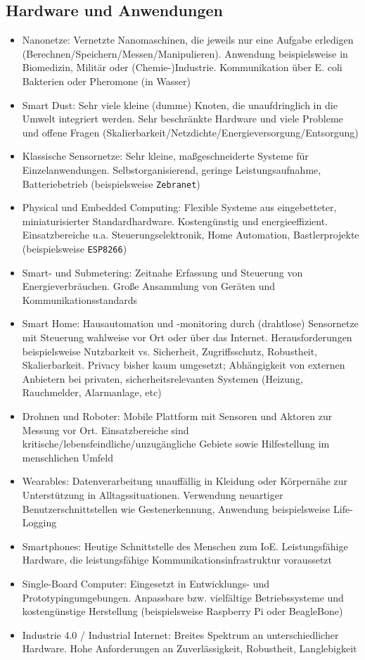 \subsection{Hardware und Anwendungen}
\begin{itemize}
	\item Nanonetze: Vernetzte Nanomaschinen, die jeweils nur eine Aufgabe erledigen (Berechnen/Speichern/Messen/Manipulieren). Anwendung beispielsweise in Biomedizin, Militär oder (Chemie-)Industrie. Kommunikation über E. coli Bakterien oder Pheromone (in Wasser)
	\item Smart Dust: Sehr viele kleine (dumme) Knoten, die unaufdringlich in die Umwelt integriert werden. Sehr beschränkte Hardware und viele Probleme und offene Fragen (Skalierbarkeit/Netzdichte/Energieversorgung/Entsorgung)
	\item Klassische Sensornetze: Sehr kleine, maßgeschneiderte Systeme für Einzelanwendungen. Selbstorganisierend, geringe Leistungsaufnahme, Batteriebetrieb (beispielsweise \texttt{Zebranet})
	\item Physical und Embedded Computing: Flexible Systeme aus eingebetteter, miniaturisierter Standardhardware. Kostengünstig und energieeffizient. Einsatzbereiche u.a. Steuerungselektronik, Home Automation, Bastlerprojekte (beispielsweise \texttt{ESP8266})
	\item Smart- und Submetering: Zeitnahe Erfassung und Steuerung von Energieverbräuchen. Große Ansammlung von Geräten und Kommunikationsstandards
	\item Smart Home: Hausautomation und -monitoring durch (drahtlose) Sensornetze mit Steuerung wahlweise vor Ort oder über das Internet. Herausforderungen beispielsweise Nutzbarkeit vs. Sicherheit, Zugriffsschutz, Robustheit, Skalierbarkeit. Privacy bisher kaum umgesetzt; Abhängigkeit von externen Anbietern bei privaten, sicherheitsrelevanten Systemen (Heizung, Rauchmelder, Alarmanlage, etc)
	\item Drohnen und Roboter: Mobile Plattform mit Sensoren und Aktoren zur Messung vor Ort. Einsatzbereiche sind kritische/lebensfeindliche/unzugängliche Gebiete sowie Hilfestellung im menschlichen Umfeld
	\item Wearables: Datenverarbeitung unauffällig in Kleidung oder Körpernähe zur Unterstützung in Alltagssituationen. Verwendung neuartiger Benutzerschnittstellen wie Gestenerkennung, Anwendung beispielsweise Life-Logging
	\item Smartphones: Heutige Schnittstelle des Menschen zum IoE. Leistungsfähige Hardware, die leistungsfähige Kommunikationsinfrastruktur voraussetzt
	\item Single-Board Computer: Eingesetzt in Entwicklungs- und Prototypingumgebungen. Anpassbare bzw. vielfältige Betriebssysteme und kostengünstige Herstellung (beispielsweise Raspberry Pi oder BeagleBone)
	\item Industrie 4.0 / Industrial Internet: Breites Spektrum an unterschiedlicher Hardware. Hohe Anforderungen an Zuverlässigkeit, Robustheit, Langlebigkeit
\end{itemize}



